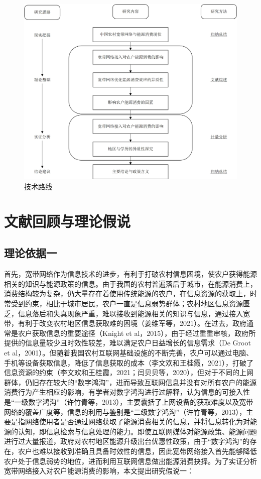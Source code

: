 \documentclass[a4paper, 12pt, oneside]{article} %
\begin{document}
	~\ %
	\begin{figure}[htbp]
		\centering
		\includegraphics[width = 1\textwidth]{技术路线.jpg}
		{\heiti {} \caption{技术路线}}
	\end{figure}
	\section{文献回顾与理论假说}
	\subsection{理论依据一}
	首先，宽带网络作为信息技术的进步，有利于打破农村信息困境，使农户获得能源相关的知识与能源政策的信息。由于我国的农村普遍落后于城市，在能源消费上，消费结构较为复杂，仍大量存在着使用传统能源的农户，在信息资源的获取上，时常受到约束，相比于城市居民，农户一直是信息弱势群体；农村地区信息资源匮乏，信息落后和失真现象严重，难以接收到能源相关的知识与信息，通过接入宽带，有利于改变农村地区信息获取难的困境（姜维军等，2021）。在过去，政府通常是农户获取信息的重要途径（Knight et al，2015），由于经过重重审核，政府所提供的信息量较少且时效性较差，难以满足农户日益增长的信息需求（De Groot et al，2001）。但随着我国农村互联网基础设施的不断完善，农户可以通过电脑、手机等设备获取信息，降低了信息获取的成本（李文欢和王桂霞，2021），打破了信息资源的约束（李文欢和王桂霞，2021；闫贝贝等，2020），但对于不同的上网群体，仍旧存在较大的“数字鸿沟”，进而导致互联网信息并没有对所有农户的能源消费行为产生相应的影响，有学者对数字鸿沟进行过解释，认为信息的可接入性是“一级数字鸿沟”（许竹青等，2013），主要囊括了上网设备的获取难度以及宽带网络的覆盖广度等，信息的利用与鉴别是“二级数字鸿沟”（许竹青等，2013），主要是指网络使用者是否通过网络获取了能源消费相关的信息，并将信息转化为对能源的认知，即信息检索与信息处理的能力。即使互联网媒体对能源政策、能源问题进行过大量报道，政府对农村地区能源升级出台优惠性政策，由于“数字鸿沟”的存在，农户也难以接收到准确且具备时效性的信息，因此宽带网络接入首先能够降低农户处于信息弱势的地位，进而利用互联网信息做出能源消费抉择。为了实证分析宽带网络接入对农户能源消费的影响，本文提出研究假说一：
	
\end{document}
